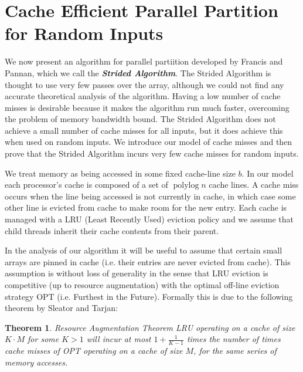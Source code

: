 \documentclass[twocolumn, twoside, 11pt]{article}
\newcommand{\defn}[1]       {{\textit{\textbf{\boldmath #1}}}}
\renewcommand{\paragraph}[1]{\vspace{0.09in}\noindent{\bf \boldmath #1.}}
\newtheorem{theorem}{Theorem}
\begin{document}








\section{Cache Efficient Parallel Partition for Random Inputs}
We now present an algorithm for parallel partiition developed by Francis and Pannan, which we call the \defn{Strided Algorithm}.
The Strided Algorithm is thought to use very few passes over the array, although we could not find any accurate theoretical analysis of the algorithm.
Having a low number of cache misses is desirable because it makes the algorithm run much faster, overcoming the problem of memory bandwidth bound.
The Strided Algorithm does not achieve a small number of cache misses for all inputs, but it does achieve this when used on random inputs.
We introduce our model of cache misses and then prove that the Strided Algorithm incurs very few cache misses for random inputs.

\paragraph{Modelling Cache Misses}
We treat memory as being accessed in some fixed cache-line size $b$. 
In our model each processor's cache is composed of a set of $\operatorname{polylog}{n}$ cache lines.
A cache miss occurs when the line being accessed is not currently in cache, in which case some other line is evicted from cache to make room for the new entry.
Each cache is managed with a LRU (Least Recently Used) eviction policy and we assume that child threads inherit their cache contents from their parent.

In the analysis of our algorithm it will be useful to assume that certain small arrays are pinned in cache (i.e. their entries are never evicted from cache).
This assumption is without loss of generality in the sense that LRU eviction is competitive (up to resource augmentation) with the optimal off-line eviction strategy OPT (i.e. Furthest in the Future).
Formally this is due to the following theorem by Sleator and Tarjan:
\begin{theorem}{Resource Augmentation Theorem \cite{SleatorTa85}}
	LRU operating on a cache of size $K\cdot M$ for some $K>1$ will incur at most $1+\frac{1}{K-1}$ times the number of times cache misses of OPT operating on a cache of size $M$, for the same series of memory accesses.
\end{theorem}
\end{document}
